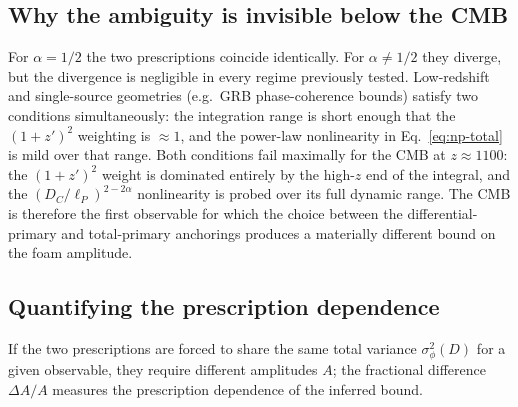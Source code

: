 \documentclass[aps,prd,onecolumn,amsmath,amssymb]{revtex4-2}
\begin{document}
\subsection{Why the ambiguity is invisible below the CMB}

For $\alpha=1/2$ the two prescriptions coincide identically. For
$\alpha\neq1/2$ they diverge, but the divergence is negligible in every regime
previously tested. Low-redshift and single-source geometries (e.g.\ GRB
phase-coherence bounds) satisfy two conditions simultaneously: the integration
range is short enough that the $(1+z')^2$ weighting is $\approx 1$, and the
power-law nonlinearity in Eq.~\eqref{eq:np-total} is mild over that range. Both
conditions fail maximally for the CMB at $z\approx1100$: the $(1+z')^2$ weight
is dominated entirely by the high-$z$ end of the integral, and the
$(D_C/\ell_P)^{2-2\alpha}$ nonlinearity is probed over its full dynamic range.
The CMB is therefore the first observable for which the choice between the
differential-primary and total-primary anchorings produces a materially
different bound on the foam amplitude.

\subsection{Quantifying the prescription dependence}

If the two prescriptions are forced to share the same total variance
$\sigma_\phi^2(D)$ for a given observable, they require different amplitudes $A$;
the fractional difference $\Delta A / A$ measures the prescription dependence
of the inferred bound.
\end{document}
